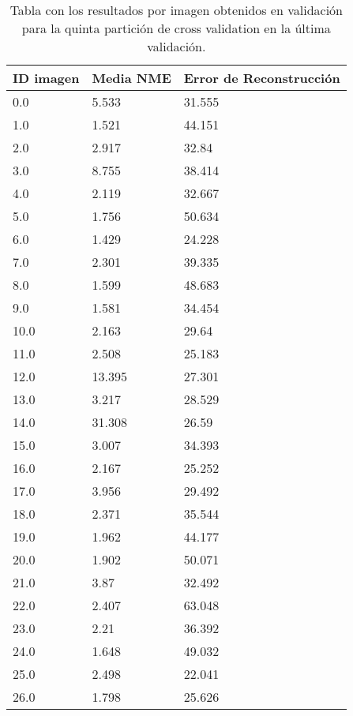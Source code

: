 \begin{table}[!ht]
    \centering
    \caption{Tabla con los resultados por imagen obtenidos en validación para la quinta partición de cross validation en la última validación.}
    \begin{tabular}{|l|l|l|}
    \hline
        ID imagen & Media NME & Error de Reconstrucción \\ \hline
        0.0 & 5.533 & 31.555 \\ \hline
        1.0 & 1.521 & 44.151 \\ \hline
        2.0 & 2.917 & 32.84 \\ \hline
        3.0 & 8.755 & 38.414 \\ \hline
        4.0 & 2.119 & 32.667 \\ \hline
        5.0 & 1.756 & 50.634 \\ \hline
        6.0 & 1.429 & 24.228 \\ \hline
        7.0 & 2.301 & 39.335 \\ \hline
        8.0 & 1.599 & 48.683 \\ \hline
        9.0 & 1.581 & 34.454 \\ \hline
        10.0 & 2.163 & 29.64 \\ \hline
        11.0 & 2.508 & 25.183 \\ \hline
        12.0 & 13.395 & 27.301 \\ \hline
        13.0 & 3.217 & 28.529 \\ \hline
        14.0 & 31.308 & 26.59 \\ \hline
        15.0 & 3.007 & 34.393 \\ \hline
        16.0 & 2.167 & 25.252 \\ \hline
        17.0 & 3.956 & 29.492 \\ \hline
        18.0 & 2.371 & 35.544 \\ \hline
        19.0 & 1.962 & 44.177 \\ \hline
        20.0 & 1.902 & 50.071 \\ \hline
        21.0 & 3.87 & 32.492 \\ \hline
        22.0 & 2.407 & 63.048 \\ \hline
        23.0 & 2.21 & 36.392 \\ \hline
        24.0 & 1.648 & 49.032 \\ \hline
        25.0 & 2.498 & 22.041 \\ \hline
        26.0 & 1.798 & 25.626 \\ \hline
    \end{tabular}
    \label{table:Encode_images_5}
\end{table}

\endinput
